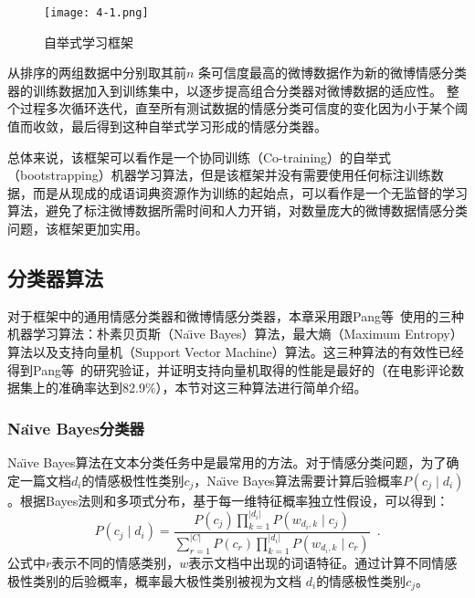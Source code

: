 \begin{landscape}
\begin{figure*}[htp] 
\centering%
\texttt{[image: 4-1.png]}
\caption{自举式学习框架}
\label{fig4-1}
\end{figure*}
\end{landscape}
从排序的两组数据中分别取其前$ n $ 条可信度最高的微博数据作为新的微博情感分类器的训练数据加入到训练集中，以逐步提高组合分类器对微博数据的适应性。
整个过程多次循环迭代，直至所有测试数据的情感分类可信度的变化因为小于某个阈值而收敛，最后得到这种自举式学习形成的情感分类器。

总体来说，该框架可以看作是一个协同训练（Co-training）的自举式（bootstrapping）机器学习算法，但是该框架并没有需要使用任何标注训练数据，而是从现成的成语词典资源作为训练的起始点，可以看作是一个无监督的学习算法，避免了标注微博数据所需时间和人力开销，对数量庞大的微博数据情感分类问题，该框架更加实用。

\subsection{分类器算法}
\label{classifier}
对于框架中的通用情感分类器和微博情感分类器，本章采用跟Pang等~使用的三种机器学习算法：朴素贝页斯（Na\"\i ve Bayes）算法，最大熵（Maximum Entropy）算法以及支持向量机（Support Vector Machine）算法。这三种算法的有效性已经得到Pang等~的研究验证，并证明支持向量机取得的性能是最好的（在电影评论数据集上的准确率达到82.9\%），本节对这三种算法进行简单介绍。

\subsubsection{Na\"\i ve Bayes分类器}
\label{bayes}
Na\"\i ve Bayes算法在文本分类任务中是最常用的方法。对于情感分类问题，为了确定一篇文档$ d_{i}$的情感极性性类别$ c_{j} $，Na\"\i ve Bayes算法需要计算后验概率$ P \left(c_{j} \mid d_{i} \right)$。根据Bayes法则和多项式分布，基于每一维特征概率独立性假设，可以得到：
\begin{equation}
\label{e4}
P \left(c_{j} \mid d_{i} \right) = \frac{P \left( c_{j} \right)\prod_{k=1}^{| d_{i} |} P \left( w_{d_{i},k} \mid c_{j} \right)}{\sum_{r=1}^{|C|}P \left( c_{r} \right)\prod_{k=1}^{| d_{i} |} P \left( w_{d_{i},k} \mid c_{r} \right)} \enspace .
\end{equation}
公式中$ r $表示不同的情感类别，$ w $表示文档中出现的词语特征。通过计算不同情感极性类别的后验概率，概率最大极性类别被视为文档 $ d_{i} $的情感极性类别$ c_j $。


